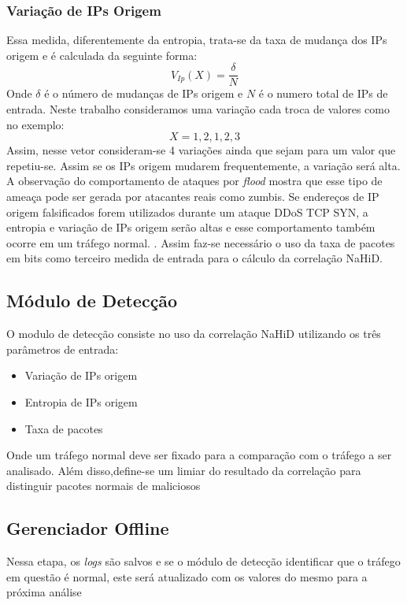 \subsubsection{Variação de IPs Origem}
Essa medida, diferentemente da entropia, trata-se da taxa de mudança dos IPs origem e é calculada da seguinte forma:
\begin{equation}
	V_{Ip}(X) = \frac{\delta}{N}
\end{equation}
Onde $\delta$ é o número de mudanças de IPs origem e $N$ é o numero total de IPs de entrada. Neste trabalho consideramos uma variação cada troca de valores como no exemplo:
\begin{equation}
	X = {1,2,1,2,3}
\end{equation}
Assim, nesse vetor consideram-se 4 variações ainda que sejam para um valor que repetiu-se. Assim se os IPs origem mudarem frequentemente, a variação será alta. \cite{HOQUE201748}
\\
A observação do comportamento de ataques por \textit{flood} mostra que esse tipo de ameaça pode ser gerada por atacantes reais como zumbis. Se endereços de IP origem falsificados forem utilizados durante um ataque DDoS TCP SYN, a entropia e variação de IPs origem serão altas e esse comportamento também ocorre em um tráfego normal. \cite{HOQUE201748}. Assim faz-se necessário o uso da taxa de pacotes em bits como terceiro medida de entrada para o cálculo da correlação NaHiD.

\subsection{Módulo de Detecção}
O modulo de detecção consiste no uso da correlação NaHiD utilizando os três parâmetros de entrada:
\begin{itemize}
	\item Variação de IPs origem
	\item Entropia de IPs origem
	\item Taxa de pacotes
\end{itemize}
Onde um tráfego normal deve ser fixado para a comparação com o tráfego a ser analisado. Além disso,define-se um limiar do resultado da correlação para distinguir pacotes normais de maliciosos 
\subsection{Gerenciador Offline}
Nessa etapa, os \textit{logs} são salvos e se o módulo de detecção identificar que o tráfego em questão é normal, este será atualizado com os valores do mesmo para a próxima análise

